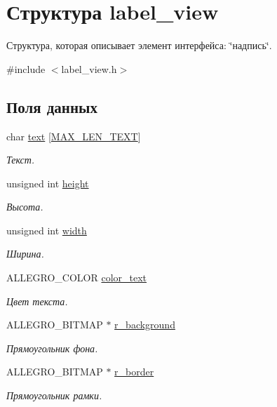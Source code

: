 \hypertarget{structlabel__view}{}\section{Структура label\+\_\+view}
\label{structlabel__view}


Структура, которая описывает элемент интерфейса\+: \char`\"{}надпись\char`\"{}.  




{\ttfamily \#include $<$label\+\_\+view.\+h$>$}

\subsection*{Поля данных}
\begin{DoxyCompactItemize}
\item 
char \hyperlink{structlabel__view_aac3274885e82ec3281d3bcc54af3b70d}{text} \mbox{[}\hyperlink{label__view_8h_aae4d8e5464b3520e10b2215db631640b}{M\+A\+X\+\_\+\+L\+E\+N\+\_\+\+T\+E\+XT}\mbox{]}
\begin{DoxyCompactList}\small\item\em Текст. \end{DoxyCompactList}\item 
unsigned int \hyperlink{structlabel__view_a0a34717ef7509ba00b71fa70f0a65af8}{height}
\begin{DoxyCompactList}\small\item\em Высота. \end{DoxyCompactList}\item 
unsigned int \hyperlink{structlabel__view_a196519a4366ea711091a993276484d5e}{width}
\begin{DoxyCompactList}\small\item\em Ширина. \end{DoxyCompactList}\item 
A\+L\+L\+E\+G\+R\+O\+\_\+\+C\+O\+L\+OR \hyperlink{structlabel__view_a66fb75fd9e28ea81703dac8c82b244cb}{color\+\_\+text}
\begin{DoxyCompactList}\small\item\em Цвет текста. \end{DoxyCompactList}\item 
A\+L\+L\+E\+G\+R\+O\+\_\+\+B\+I\+T\+M\+AP $\ast$ \hyperlink{structlabel__view_aa6ff2c0bb9e1c6d5ef4fcd3d4f7ef438}{r\+\_\+background}
\begin{DoxyCompactList}\small\item\em Прямоугольник фона. \end{DoxyCompactList}\item 
A\+L\+L\+E\+G\+R\+O\+\_\+\+B\+I\+T\+M\+AP $\ast$ \hyperlink{structlabel__view_ad6815d541438d92064bfc49669d7dfda}{r\+\_\+border}
\begin{DoxyCompactList}\small\item\em Прямоугольник рамки. \end{DoxyCompactList}\end{DoxyCompactItemize}


